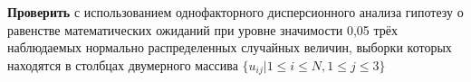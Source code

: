 \textbf{Проверить} с использованием однофакторного дисперсионного анализа
гипотезу о равенстве математических ожиданий при уровне значимости 0,05
трёх наблюдаемых нормально распределенных случайных величин, выборки
которых находятся в столбцах двумерного массива $\{ u_{ij} | 1 \le i \le N, 1 \le j \le 3 \}$


